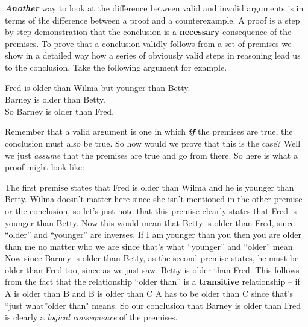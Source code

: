 \documentclass[
  12pt, openany]{book}
\makeatletter
\newenvironment{kframe}{%
\medskip{}
\setlength{\fboxsep}{.8em}
 \def\at@end@of@kframe{}%
 \ifinner\ifhmode%
  \def\at@end@of@kframe{\end{minipage}}%
  \begin{minipage}{\columnwidth}%
 \fi\fi%
 \def\FrameCommand##1{\hskip\@totalleftmargin \hskip-\fboxsep
 \colorbox{shadecolor}{##1}\hskip-\fboxsep
     \hskip-\linewidth \hskip-\@totalleftmargin \hskip\columnwidth}%
 \MakeFramed {\advance\hsize-\width
   \@totalleftmargin\z@ \linewidth\hsize
   \@setminipage}}%
 {\par\unskip\endMakeFramed%
 \at@end@of@kframe}
\newenvironment{rmdblock}[1]
  {
  \begin{itemize}
  \renewcommand{\labelitemi}{
    \raisebox{-.7\height}[0pt][0pt]{
      {\setkeys{Gin}{width=3em,keepaspectratio}\texttt{[image: img/\#1]}}
    }
  }
  \setlength{\fboxsep}{1em}
  \begin{kframe}
  \item
  }
  {
  \end{kframe}
  \end{itemize}
  }
\newenvironment{tip}
  {\begin{rmdblock}{tip}}
  {\end{rmdblock}}
\theoremstyle{definition}
\theoremstyle{definition}
\theoremstyle{definition}
\theoremstyle{definition}
\theoremstyle{remark}
\makeatother
\begin{document}
\textbf{\emph{Another}} way to look at the difference between valid and invalid arguments is in terms of the difference between a proof and a counterexample. A proof is a step by step demonstration that the conclusion is a \textbf{necessary} consequence of the premises. To prove that a conclusion validly follows from a set of premises we show in a detailed way how a series of obviously valid steps in reasoning lead us to the conclusion. Take the following argument for example.

\begin{center}

\begin{argument}
Fred is older than Wilma but younger than Betty.\\
Barney is older than Betty.\\

So Barney is older than Fred.

\end{argument}


\end{center}

Remember that a valid argument is one in which \textbf{\emph{if}} the premises are true, the conclusion must also be true. So how would we prove that this is the case? Well we just \emph{assume} that the premises are true and go from there. So here is what a proof might look like:

\begin{tip}
The first premise states that Fred is older than Wilma and he is younger than Betty. Wilma doesn't matter here since she isn't mentioned in the other premise or the conclusion, so let's just note that this premise clearly states that Fred is younger than Betty. Now this would mean that Betty is older than Fred, since ``older'' and ``younger'' are inverses. If I am younger than you then you are older than me no matter who we are since that's what ``younger'' and ``older'' mean. Now since Barney is older than Betty, as the second premise states, he must be older than Fred too, since as we just saw, Betty is older than Fred. This follows from the fact that the relationship ``older than'' is a \textbf{transitive} relationship -- if A is older than B and B is older than C A has to be older than C since that's ``just what''older than" means. So our conclusion that Barney is older than Fred is clearly a \emph{logical consequence} of the premises.

\end{tip}
\end{document}
